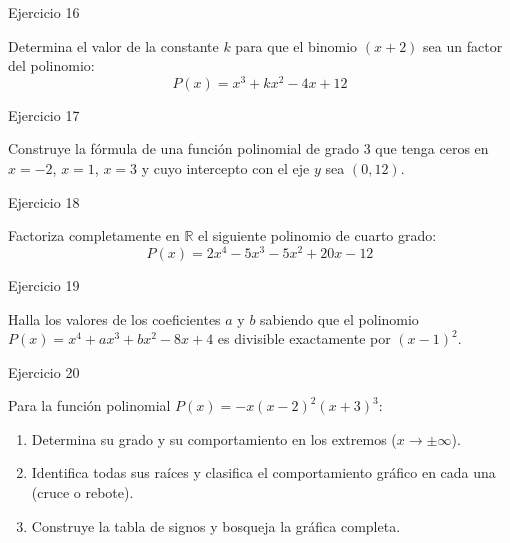 \documentclass[aspectratio=169]{beamer}
\begin{document}
\begin{frame}{Ejercicio 16}
  \begin{mwejercicio}
    Determina el valor de la constante $k$ para que el binomio $(x + 2)$ sea un factor del polinomio:
    $$P(x) = x^3 + kx^2 - 4x + 12$$
  \end{mwejercicio}
  \vspace{3.5cm}
\end{frame}
\begin{frame}{Ejercicio 17}
  \begin{mwejercicio}
    Construye la fórmula de una función polinomial de grado 3 que tenga ceros en $x = -2$, $x = 1$, $x = 3$ y cuyo intercepto con el eje $y$ sea $(0, 12)$.
  \end{mwejercicio}
  \vspace{3.5cm}
\end{frame}
\begin{frame}{Ejercicio 18}
  \begin{mwejercicio}
    Factoriza completamente en $\mathbb{R}$ el siguiente polinomio de cuarto grado:
    $$P(x) = 2x^4 - 5x^3 - 5x^2 + 20x - 12$$
  \end{mwejercicio}
  \vspace{3.5cm}
\end{frame}
\begin{frame}{Ejercicio 19}
  \begin{mwejercicio}
    Halla los valores de los coeficientes $a$ y $b$ sabiendo que el polinomio $P(x) = x^4 + ax^3 + bx^2 - 8x + 4$ es divisible exactamente por $(x - 1)^2$.
  \end{mwejercicio}
  \vspace{3.5cm}
\end{frame}
\begin{frame}{Ejercicio 20}
  \begin{mwejercicio}
    Para la función polinomial $P(x) = -x(x - 2)^2(x + 3)^3$:
    \begin{enumerate}
      \item Determina su grado y su comportamiento en los extremos ($x \to \pm\infty$).
      \item Identifica todas sus raíces y clasifica el comportamiento gráfico en cada una (cruce o rebote).
      \item Construye la tabla de signos y bosqueja la gráfica completa.
    \end{enumerate}
  \end{mwejercicio}
  \vspace{1.5cm}
\end{frame}
\end{document}
